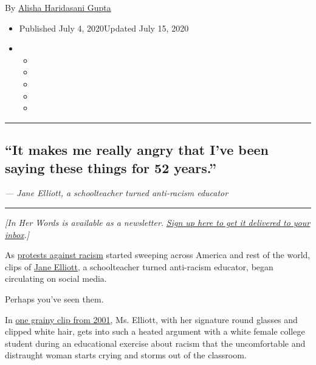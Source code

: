 By
\href{https://www.nytimes3xbfgragh.onion/by/alisha-haridasani-gupta}{Alisha
Haridasani Gupta}

\begin{itemize}
\item
  Published July 4, 2020Updated July 15, 2020
\item
  \begin{itemize}
  \item
  \item
  \item
  \item
  \item
  \end{itemize}
\end{itemize}

\begin{center}\rule{0.5\linewidth}{\linethickness}\end{center}

\hypertarget{it-makes-me-really-angry-that-ive-been-saying-these-things-for-52-years}{%
\subsection{``It makes me really angry that I've been saying these
things for 52
years.''}\label{it-makes-me-really-angry-that-ive-been-saying-these-things-for-52-years}}

\emph{--- Jane Elliott, a schoolteacher turned anti-racism educator}

\begin{center}\rule{0.5\linewidth}{\linethickness}\end{center}

\emph{{[}In Her Words is available as a newsletter.}
\href{https://www.nytimes3xbfgragh.onion/newsletters/in-her-words}{\emph{Sign
up here to get it delivered to your inbox}}\emph{.{]}}

As
\href{https://www.nytimes3xbfgragh.onion/news-event/george-floyd-protests-minneapolis-new-york-los-angeles}{protests
against racism} started sweeping across America and rest of the world,
clips of
\href{https://www.nytimes3xbfgragh.onion/2020/07/15/style/jane-elliott-anti-racism.html}{Jane
Elliott}, a schoolteacher turned anti-racism educator, began circulating
on social media.

Perhaps you've seen them.

In
\href{https://twitter.com/adilray/status/1269196871534284802?s=20}{one
grainy clip from 2001}, Ms. Elliott, with her signature round glasses
and clipped white hair, gets into such a heated argument with a white
female college student during an educational exercise about racism that
the uncomfortable and distraught woman starts crying and storms out of
the classroom.

